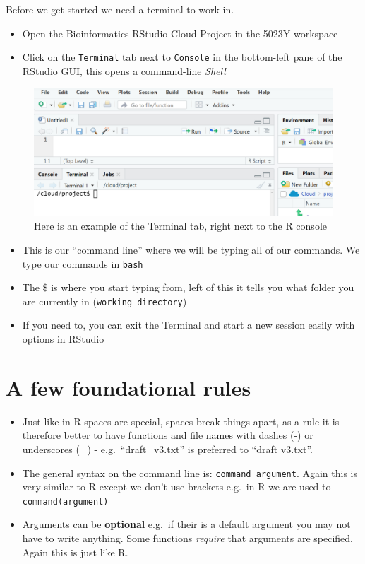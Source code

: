 \documentclass[
]{book}
\begin{document}
Before we get started we need a terminal to work in.

\begin{itemize}
\item
  Open the Bioinformatics RStudio Cloud Project in the 5023Y workspace
\item
  Click on the \texttt{Terminal} tab next to \texttt{Console} in the bottom-left pane of the RStudio GUI, this opens a command-line \emph{Shell}
\end{itemize}

\begin{figure}

{\centering \includegraphics[width=0.8\linewidth]{images/terminal} 

}

\caption{Here is an example of the Terminal tab, right next to the R console}\label{fig:unnamed-chunk-4}
\end{figure}

\begin{itemize}
\item
  This is our ``command line'' where we will be typing all of our commands. We type our commands in \texttt{bash}
\item
  The \$ is where you start typing from, left of this it tells you what folder you are currently in (\texttt{working\ directory})
\item
  If you need to, you can exit the Terminal and start a new session easily with options in RStudio
\end{itemize}

\hypertarget{a-few-foundational-rules}{%
\section{A few foundational rules}\label{a-few-foundational-rules}}

\begin{itemize}
\item
  Just like in R spaces are special, spaces break things apart, as a rule it is therefore better to have functions and file names with dashes (-) or underscores (\_) - e.g.~``draft\_v3.txt'' is preferred to ``draft v3.txt''.
\item
  The general syntax on the command line is: \texttt{command\ argument}. Again this is very similar to R except we don't use brackets e.g.~in R we are used to \texttt{command(argument)}
\item
  Arguments can be \textbf{optional} e.g.~if their is a default argument you may not have to write anything. Some functions \emph{require} that arguments are specified. Again this is just like R.
\end{itemize}
\end{document}

